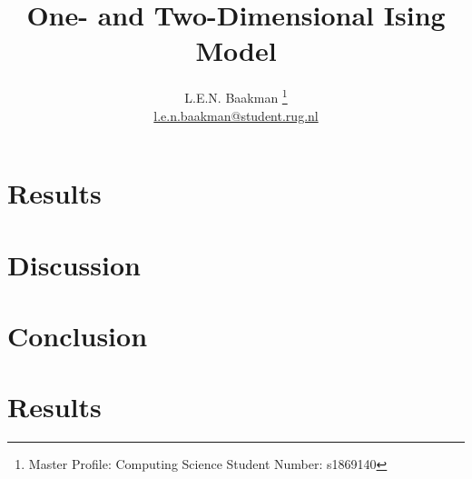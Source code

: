 \documentclass[oneside, a4paper, twocolumn, reqno, fleqn, 11pt]{article}
\title{\sc One- and Two-Dimensional Ising Model}
\author{L.E.N. Baakman%
	\thanks{%
		Master Profile: Computing Science\newline
	 	\hspace*{14pt} Student Number: s1869140%
	}\\%
	\href{mailto:l.e.n.baakman@student.rug.nl}{l.e.n.baakman@student.rug.nl}
}
\begin{document}
\maketitle

% 

% 	

% 	

\section{Results}
\label{s:results}


\section{Discussion}
\label{s:discussion}


\section{Conclusion}
\label{s:conclusion}


\printbibliography

\onecolumn
\allowdisplaybreaks %

\appendix
% 

\section{Results}
\label{a:results1D}


% 
\end{document}
